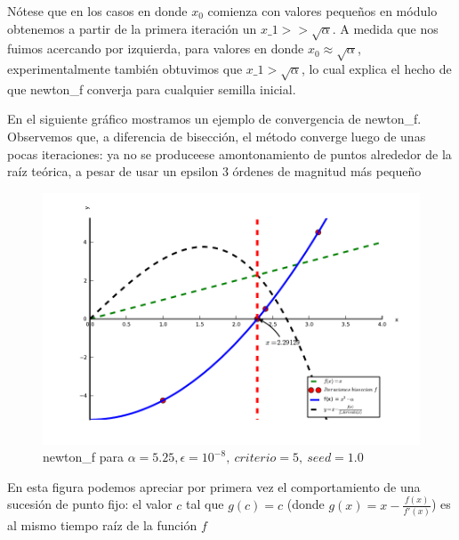 Nótese que en los casos en donde $x_0$ comienza con valores peque\~nos en módulo obtenemos a partir de la primera iteración un $x\_1 >> \sqrt{\alpha}$. A medida que nos fuimos
acercando por izquierda, para valores en donde $x_{0} \approx \sqrt{\alpha}$,
experimentalmente también obtuvimos que $x\_1 > \sqrt{\alpha}$, lo cual explica el hecho de que newton\_f converja para cualquier semilla inicial.

En el siguiente gráfico mostramos un ejemplo de convergencia de newton\_f. Observemos que, a diferencia de bisección, el método converge luego de unas pocas iteraciones: ya no se 
produceese amontonamiento de puntos alrededor de la raíz teórica, a pesar de usar un epsilon 3 órdenes de magnitud más peque\~no 

\begin{figure}[!h]
	\begin{center}
		  \includegraphics[keepaspectratio]{../Imagenes/exp1/newton_f.pdf}
		  \caption{newton\_f para $\alpha=5.25, \epsilon=10^{-8}, \ criterio = 5, \ seed = 1.0$}
		  \label{fig:contra1}
	\end{center}
\end{figure}
\FloatBarrier

En esta figura podemos apreciar por primera vez el comportamiento de una sucesión de punto fijo: el valor $c$ tal que $g(c)=c$ (donde $g(x) = x - \displaystyle \frac{f(x)}{f'(x)}$) es al mismo tiempo
raíz de la función $f$